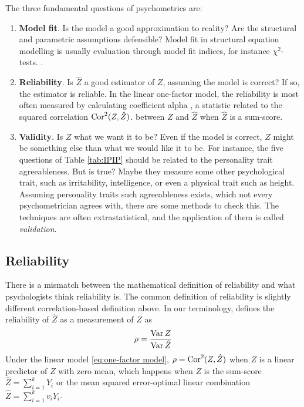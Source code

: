 The three fundamental questions of psychometrics are:
\begin{enumerate}
\item \textbf{Model fit}. Is the model a good approximation to reality? Are the structural and parametric assumptions defensible? Model fit in structural equation modelling is usually evaluation through model fit indices, for instance $\chi^{2}$-tests. \parencite[Chapter 15]{Mulaik2009-gc}.
\item \textbf{Reliability}. Is $\hat{Z}$ a good estimator of $Z$, assuming the model is correct? If so, the estimator is reliable. In the linear one-factor model, the reliability is most often measured by calculating coefficient alpha \parencite{Cronbach1951-in}, a statistic related to the squared correlation $\operatorname{Cor}^{2}(Z,\hat{Z})$. between $Z$ and $\hat{Z}$ when $\hat{Z}$ is a sum-score.
\item \textbf{Validity}. Is $Z$ what we want it to be? Even if the model is correct, $Z$ might be something else than what we would like it to be. For instance, the five questions of Table \ref{tab:IPIP} should be related to the personality trait agreeableness. But is true? Maybe they measure some other psychological trait, such as irritability, intelligence, or even a physical trait such as height. Assuming personality traits such agreeableness exists, which not every psychometrician agrees with, there are some methods to check this. The techniques are often extrastatistical, and the application of them is called \emph{validation}. \parencite[Chapter 6]{Borsboom2005-iq}
\end{enumerate}

\subsection{Reliability}

There is a mismatch between the mathematical definition of reliability and what psychologists think reliability is. The common definition of reliability is slightly different correlation-based definition above. In our terminology, \textcite[Equation 3]{Raykov2019-yr} defines the reliability of $\hat{Z}$ as a measurement of $Z$ as
\begin{equation}
\rho=\frac{\operatorname{Var} Z}{\operatorname{Var}\hat{Z}}\label{eq:rakov-reliabiliy}
\end{equation} Under the linear model \eqref{eq:one-factor model}, $\rho = \operatorname{Cor}^2(Z,\hat{Z})$ when $Z$ is a linear predictor of $Z$ with zero mean, which happens when $Z$ is the sum-score $\hat{Z}=\sum_{i=1}^{k}Y_{i}$ or the mean squared error-optimal linear combination $\hat{Z}=\sum_{i=1}^{k}v_{i}Y_{i}$.


